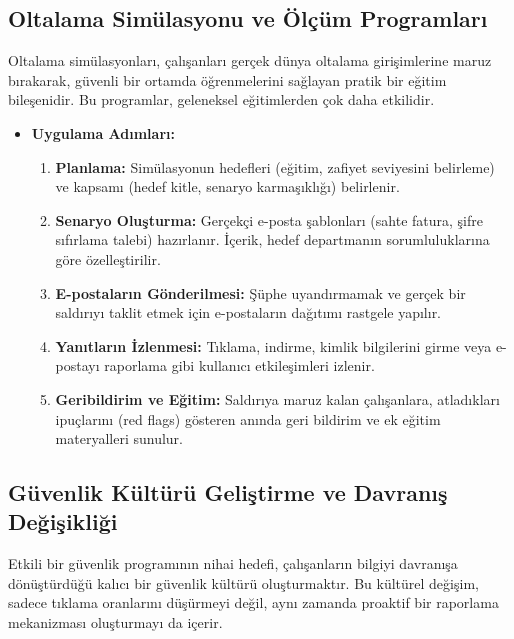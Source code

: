\subsection{Oltalama Simülasyonu ve Ölçüm Programları}

Oltalama simülasyonları, çalışanları gerçek dünya oltalama girişimlerine maruz bırakarak, güvenli bir ortamda öğrenmelerini sağlayan pratik bir eğitim bileşenidir. Bu programlar, geleneksel eğitimlerden çok daha etkilidir.

\begin{itemize}
    \item \textbf{Uygulama Adımları:}
    \begin{enumerate}
        \item \textbf{Planlama:} Simülasyonun hedefleri (eğitim, zafiyet seviyesini belirleme) ve kapsamı (hedef kitle, senaryo karmaşıklığı) belirlenir.
        \item \textbf{Senaryo Oluşturma:} Gerçekçi e-posta şablonları (sahte fatura, şifre sıfırlama talebi) hazırlanır. İçerik, hedef departmanın sorumluluklarına göre özelleştirilir.
        \item \textbf{E-postaların Gönderilmesi:} Şüphe uyandırmamak ve gerçek bir saldırıyı taklit etmek için e-postaların dağıtımı rastgele yapılır.
        \item \textbf{Yanıtların İzlenmesi:} Tıklama, indirme, kimlik bilgilerini girme veya e-postayı raporlama gibi kullanıcı etkileşimleri izlenir.
        \item \textbf{Geribildirim ve Eğitim:} Saldırıya maruz kalan çalışanlara, atladıkları ipuçlarını (red flags) gösteren anında geri bildirim ve ek eğitim materyalleri sunulur.
    \end{enumerate}
\end{itemize}

\subsection{Güvenlik Kültürü Geliştirme ve Davranış Değişikliği}

Etkili bir güvenlik programının nihai hedefi, çalışanların bilgiyi davranışa dönüştürdüğü kalıcı bir güvenlik kültürü oluşturmaktır. Bu kültürel değişim, sadece tıklama oranlarını düşürmeyi değil, aynı zamanda proaktif bir raporlama mekanizması oluşturmayı da içerir.

